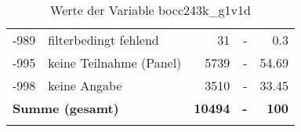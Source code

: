 \begin{longtable}{Xlrrr}
       -989 & filterbedingt fehlend & \num{31} & - & \num[round-mode=places,round-precision=2]{0.3} \\

       -995 & keine Teilnahme (Panel) & \num{5739} & - & \num[round-mode=places,round-precision=2]{54.69} \\

       -998 & keine Angabe & \num{3510} & - & \num[round-mode=places,round-precision=2]{33.45} \\

     \midrule
     \multicolumn{2}{l}{\textbf{Summe (gesamt)}} & \textbf{\num{10494}} & \textbf{-} & \textbf{\num{100}} \\
     \bottomrule
     \caption{Werte der Variable bocc243k\_g1v1d}
     \end{longtable}
     
